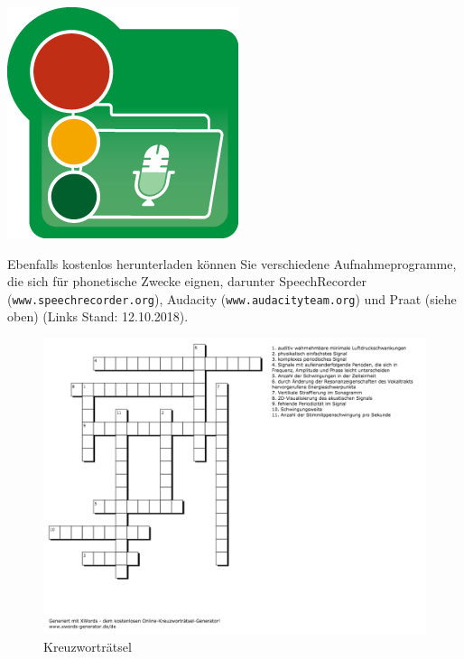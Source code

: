 \begin {minipage} {0.1\textwidth}
\includegraphics[width=\textwidth]{grafiken/sprachaufnahme/speechrecorder.png}
\end{minipage}
\hspace{1cm}
\begin{minipage} {0.6\textwidth}
Ebenfalls kostenlos herunterladen können Sie verschiedene Aufnahmeprogramme, die sich für phonetische Zwecke eignen, darunter SpeechRecorder ({\tt www.speechrecorder.org}), Audacity  ({\tt www.audacityteam.org}) und Praat (siehe oben) (Links Stand: 12.10.2018).
\end {minipage}



\begin{figure}[htb]
\begin{center}
\includegraphics[width=1.2\textwidth]{grafiken/sprechen/kreuzwortraetsel.png}
\caption{Kreuzworträtsel}
\label{fig5}
\end{center}
\end{figure}
